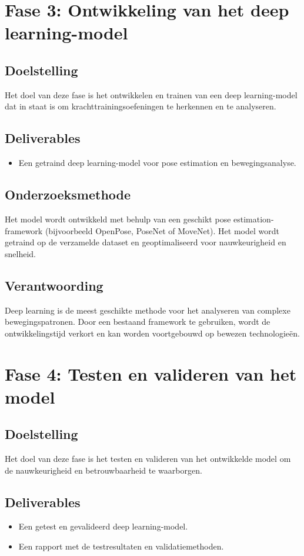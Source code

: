 \section{Fase 3: Ontwikkeling van het deep learning-model}
\subsection{Doelstelling}
Het doel van deze fase is het ontwikkelen en trainen van een deep learning-model dat in staat is om krachttrainingsoefeningen te herkennen en te analyseren.  

\subsection{Deliverables}
\begin{itemize}
    \item Een getraind deep learning-model voor pose estimation en bewegingsanalyse.
\end{itemize}

\subsection{Onderzoeksmethode}
Het model wordt ontwikkeld met behulp van een geschikt pose estimation-framework (bijvoorbeeld OpenPose, PoseNet of MoveNet). Het model wordt getraind op de verzamelde dataset en geoptimaliseerd voor nauwkeurigheid en snelheid.  

\subsection{Verantwoording}
Deep learning is de meest geschikte methode voor het analyseren van complexe bewegingspatronen. Door een bestaand framework te gebruiken, wordt de ontwikkelingstijd verkort en kan worden voortgebouwd op bewezen technologieën.  

\section{Fase 4: Testen en valideren van het model}
\subsection{Doelstelling}
Het doel van deze fase is het testen en valideren van het ontwikkelde model om de nauwkeurigheid en betrouwbaarheid te waarborgen.  

\subsection{Deliverables}
\begin{itemize}
    \item Een getest en gevalideerd deep learning-model.
    \item Een rapport met de testresultaten en validatiemethoden.
\end{itemize}

